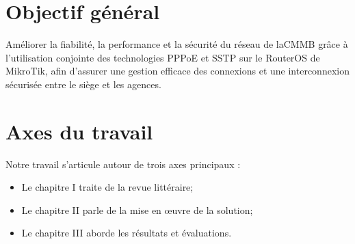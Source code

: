 \section*{Objectif général}

Améliorer la fiabilité, la performance et la sécurité du réseau de la\gls{CMMB}  grâce à 
l’utilisation conjointe des technologies PPPoE et SSTP sur le \gls{RouterOS} de 
MikroTik, afin d’assurer une gestion efficace des connexions et une interconnexion 
sécurisée entre le siège et les agences.

\section*{Axes du travail}

Notre travail s’articule autour de trois axes principaux :
\begin{itemize}[leftmargin=2em]
    \item Le chapitre I traite de la revue littéraire;
    \item Le chapitre II parle de la mise en œuvre de la solution;
    \item Le chapitre III aborde les résultats et évaluations.
\end{itemize}
